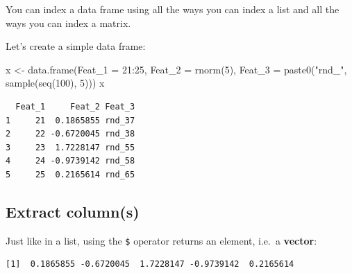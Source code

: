 \documentclass[
]{book}
\makeatletter
\newenvironment{Shaded}{\begin{snugshade}}{\end{snugshade}}
\newcommand{\AttributeTok}[1]{\textcolor[rgb]{0.77,0.63,0.00}{#1}}
\newcommand{\DecValTok}[1]{\textcolor[rgb]{0.00,0.00,0.81}{#1}}
\newcommand{\FunctionTok}[1]{\textcolor[rgb]{0.00,0.00,0.00}{#1}}
\newcommand{\NormalTok}[1]{#1}
\newcommand{\OtherTok}[1]{\textcolor[rgb]{0.56,0.35,0.01}{#1}}
\newcommand{\SpecialCharTok}[1]{\textcolor[rgb]{0.00,0.00,0.00}{#1}}
\newcommand{\StringTok}[1]{\textcolor[rgb]{0.31,0.60,0.02}{#1}}
\newenvironment{kframe}{%
\medskip{}
\setlength{\fboxsep}{.8em}
 \def\at@end@of@kframe{}%
 \ifinner\ifhmode%
  \def\at@end@of@kframe{\end{minipage}}%
  \begin{minipage}{\columnwidth}%
 \fi\fi%
 \def\FrameCommand##1{\hskip\@totalleftmargin \hskip-\fboxsep
 \colorbox{shadecolor}{##1}\hskip-\fboxsep
     \hskip-\linewidth \hskip-\@totalleftmargin \hskip\columnwidth}%
 \MakeFramed {\advance\hsize-\width
   \@totalleftmargin\z@ \linewidth\hsize
   \@setminipage}}%
 {\par\unskip\endMakeFramed%
 \at@end@of@kframe}
\newenvironment{rmdblock}[1]
  {
  \begin{itemize}
  \renewcommand{\labelitemi}{
    \raisebox{-.7\height}[0pt][0pt]{
      {\setkeys{Gin}{width=3em,keepaspectratio}\texttt{[image: images/\#1]}}
    }
  }
  \setlength{\fboxsep}{1em}
  \begin{kframe}
  \item
  }
  {
  \end{kframe}
  \end{itemize}
  }
\newenvironment{info}
  {\begin{rmdblock}{info}}
  {\end{rmdblock}}
\makeatother
\begin{document}
\begin{info}
You can index a data frame using all the ways you can index a list and
all the ways you can index a matrix.
\end{info}

Let's create a simple data frame:

\begin{Shaded}
\begin{Highlighting}[]
\NormalTok{x }\OtherTok{\textless{}{-}} \FunctionTok{data.frame}\NormalTok{(}\AttributeTok{Feat\_1 =} \DecValTok{21}\SpecialCharTok{:}\DecValTok{25}\NormalTok{,}
                \AttributeTok{Feat\_2 =} \FunctionTok{rnorm}\NormalTok{(}\DecValTok{5}\NormalTok{),}
                \AttributeTok{Feat\_3 =} \FunctionTok{paste0}\NormalTok{(}\StringTok{"rnd\_"}\NormalTok{, }\FunctionTok{sample}\NormalTok{(}\FunctionTok{seq}\NormalTok{(}\DecValTok{100}\NormalTok{), }\DecValTok{5}\NormalTok{)))}
\NormalTok{x}
\end{Highlighting}
\end{Shaded}

\begin{verbatim}
  Feat_1     Feat_2 Feat_3
1     21  0.1865855 rnd_37
2     22 -0.6720045 rnd_38
3     23  1.7228147 rnd_55
4     24 -0.9739142 rnd_58
5     25  0.2165614 rnd_65
\end{verbatim}

\hypertarget{extract-columns}{%
\subsection{Extract column(s)}\label{extract-columns}}

Just like in a list, using the \texttt{\$} operator returns an element, i.e.~a \textbf{vector}:

\begin{Shaded}
\end{Shaded}

\begin{verbatim}
[1]  0.1865855 -0.6720045  1.7228147 -0.9739142  0.2165614
\end{verbatim}

\begin{Shaded}
\end{Shaded}
\end{document}
